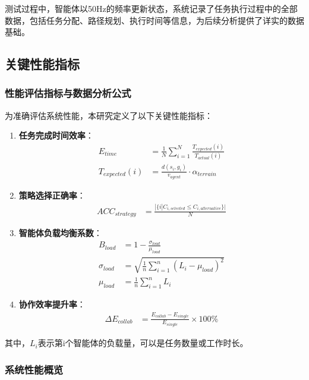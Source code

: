 \documentclass[12pt,a4paper]{article}
\begin{document}
测试过程中，智能体以50Hz的频率更新状态，系统记录了任务执行过程中的全部数据，包括任务分配、路径规划、执行时间等信息，为后续分析提供了详实的数据基础。

\subsection{关键性能指标}

\subsubsection{性能评估指标与数据分析公式}

为准确评估系统性能，本研究定义了以下关键性能指标：

\begin{enumerate}
    \item \textbf{任务完成时间效率}：
    \begin{align}
    E_{time} &= \frac{1}{N} \sum_{i=1}^{N} \frac{T_{expected}(i)}{T_{actual}(i)} \\
    T_{expected}(i) &= \frac{d(s_i, g_i)}{v_{agent}} \cdot \alpha_{terrain}
    \end{align}
    
    \item \textbf{策略选择正确率}：
    \begin{align}
    ACC_{strategy} &= \frac{|\{i | C_{i,selected} \leq C_{i,alternative}\}|}{N}
    \end{align}
    
    \item \textbf{智能体负载均衡系数}：
    \begin{align}
    B_{load} &= 1 - \frac{\sigma_{load}}{\mu_{load}} \\
    \sigma_{load} &= \sqrt{\frac{1}{n} \sum_{i=1}^{n} (L_i - \mu_{load})^2} \\
    \mu_{load} &= \frac{1}{n} \sum_{i=1}^{n} L_i
    \end{align}
    
    \item \textbf{协作效率提升率}：
    \begin{align}
    \Delta E_{collab} &= \frac{E_{collab} - E_{single}}{E_{single}} \times 100\%
    \end{align}
\end{enumerate}

其中，$L_i$表示第i个智能体的负载量，可以是任务数量或工作时长。

\subsubsection{系统性能概览}
\end{document}
